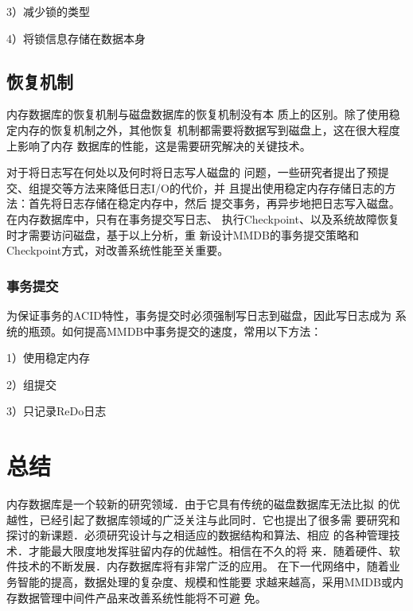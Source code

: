 \documentclass[literaturereview]{zjutreport}
\begin{document}
3）减少锁的类型

4）将锁信息存储在数据本身

\section{恢复机制}
内存数据库的恢复机制与磁盘数据库的恢复机制没有本
质上的区别。除了使用稳定内存的恢复机制之外，其他恢复
机制都需要将数据写到磁盘上，这在很大程度上影响了内存
数据库的性能，这是需要研究解决的关键技术。

对于将日志写在何处以及何时将日志写人磁盘的
问题，一些研究者提出了预提交、组提交等方法来降低日志I/O的代价，并
且提出使用稳定内存存储日志的方法：首先将日志存储在稳定内存中，然后
提交事务，再异步地把日志写入磁盘。在内存数据库中，只有在事务提交写日志、
执行Checkpoint、以及系统故障恢复时才需要访问磁盘，基于以上分析，重
新设计MMDB的事务提交策略和Checkpoint方式，对改善系统性能至关重要。


\subsection{事务提交}
为保证事务的ACID特性，事务提交时必须强制写日志到磁盘，因此写日志成为
系统的瓶颈。如何提高MMDB中事务提交的速度，常用以下方法：

1）使用稳定内存

2）组提交

3）只记录ReDo日志

\chapter{总结}
内存数据库是一个较新的研究领域．由于它具有传统的磁盘数据库无法比拟
的优越性，已经引起了数据库领域的广泛关注与此同时．它也提出了很多需
要研究和探讨的新课题．必须研究设计与之相适应的数据结构和算法、相应
的各种管理技术．才能最大限度地发挥驻留内存的优越性。相信在不久的将
来．随着硬件、软件技术的不断发展．内存数据库将有非常广泛的应用。
在下一代网络中，随着业务智能的提高，数据处理的复杂度、规模和性能要
求越来越高，采用MMDB或内存数据管理中间件产品来改善系统性能将不可避
免。

\backmatter
\endgroup %
\clearpage %


\nocite{*}                                   %

\end{document}
